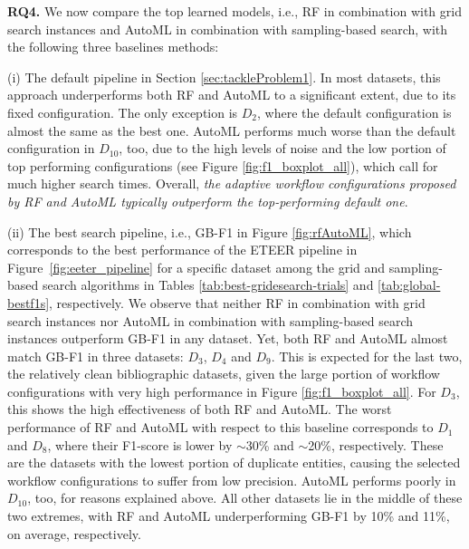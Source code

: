 \textbf{RQ4.} We now compare the top learned models, i.e.,  RF in combination with grid search instances and AutoML in combination with sampling-based search, with the following three baselines methods:

(i) The default pipeline in Section \ref{sec:tackleProblem1}. In most datasets, this approach underperforms both RF and AutoML to a significant extent, due to its fixed configuration. The only exception is $D_2$, where the default configuration is almost the same as the best one. AutoML performs much worse than the default configuration in $D_{10}$, too, due to the high levels of noise and the low portion of top performing configurations (see Figure \ref{fig:f1_boxplot_all}), which call for much higher search times. Overall, \textit{the adaptive workflow configurations proposed by RF and AutoML typically outperform the top-performing default one}.

(ii) The best search pipeline, i.e., GB-F1 in Figure \ref{fig:rfAutoML}, which corresponds to the best performance of the ETEER pipeline in Figure~\ref{fig:eeter_pipeline} for a specific dataset among the grid and sampling-based search algorithms in Tables \ref{tab:best-gridesearch-trials} and \ref{tab:global-bestf1s}, respectively.
We observe that neither RF in combination with grid search instances nor AutoML in combination with sampling-based search instances outperform GB-F1 in any dataset. Yet, both RF and AutoML almost match GB-F1 in three datasets: $D_3$, $D_4$ and $D_9$. This is expected for the last two, the relatively clean bibliographic datasets, given the large portion of workflow configurations with very high performance in Figure \ref{fig:f1_boxplot_all}. For $D_{3}$, this shows the high effectiveness of both RF and AutoML. The worst performance of RF and AutoML with respect to this baseline corresponds to $D_1$ and $D_8$, where their F1-score is lower by $\sim$30\% and $\sim$20\%, respectively. These are the datasets with the lowest portion of duplicate entities, causing the selected workflow configurations to suffer from low precision. AutoML performs poorly in $D_{10}$, too, for reasons explained above.
All other datasets lie in the middle of these two extremes, with RF and AutoML underperforming GB-F1 by 10\% and 11\%, on average, respectively. 

